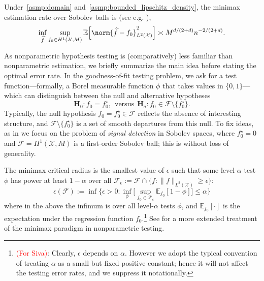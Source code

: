 \documentclass[twoside]{article}
\newcommand{\1}{\mathbf{1}}
\newcommand{\Xset}{\mathcal{X}}
\newcommand{\Leb}{L}
\newcommand{\mc}[1]{\mathcal{#1}}
\newcommand{\Ebb}{\mathbb{E}}
\newcommand{\wh}[1]{\widehat{#1}}
\theoremstyle{definition}
\theoremstyle{remark}
\begin{document}
Under~\ref{asmp:domain} and~\ref{asmp:bounded_lipschitz_density}, the minimax estimation rate over Sobolev balls is (see e.g. \citep{tsybakov2008_book}),
\begin{equation}
\label{eqn:sobolev_space_estimation_minimax_rate}
\inf_{\wh{f}} \sup_{f_0 \in H^1(\Xset, M)} \Ebb\Bigl[\norm{\wh{f} - f_0}_{L^2(\Xset)}^2\Bigr] \asymp M^{d/(2 + d)}n^{-2/(2 + d)}.
\end{equation}

As nonparametric hypothesis testing is (comparatively) less familiar than nonparametric estimation, we briefly summarize the main idea before stating the optimal error rate. In the goodness-of-fit testing problem, we ask for a test function---formally, a Borel measurable function $\phi$ that takes values in $\{0,1\}$--- which can distinguish between the null and alternative hypotheses
\begin{equation}
\mathbf{H}_0: f_0 = f_0^{\star}, ~~\textrm{versus}~~ \mathbf{H}_a: f_0 \in \mc{F} \setminus \{f_0^{\star}\}.
\end{equation} 
Typically, the null hypothesis $f_0 = f_0^{\star} \in \mc{F}$ reflects the absence of interesting structure, and $\mc{F} \setminus  \{f_0^{\star}\}$ is a set of smooth departures from this null. To fix ideas, as in \cite{ingster2009} we focus on the problem of \emph{signal detection} in Sobolev spaces, where $f_0^{\star} = 0$ and $\mc{F} = H^1(\Xset,M)$ is a first-order Sobolev ball; this is without loss of generality.

The minimax critical radius is the smallest value of $\epsilon$ such that some level-${\alpha}$ test $\phi$ has power at least $1 - \alpha$ over all $\mc{F}_{\epsilon} := \mc{F} \cap \{f: \|f\|_{\Leb^2(\Xset)} \geq \epsilon\}$:
\begin{equation*}
\epsilon(\mc{F}) := \inf\Biggl\{\epsilon > 0: \inf_{\phi} \biggl[ \sup_{f_0 \in \mc{F}_{\epsilon}} \Ebb_{f_0}[1 - \phi]\biggr] \leq \alpha\Biggr\}
\end{equation*} 
where in the above the infimum is over all level-$\alpha$ tests $\phi$, and $\Ebb_{f_0}[\cdot]$ is the expectation under the regression function $f_0$.\footnote{\textcolor{red}{(For Siva)}: Clearly, $\epsilon$ depends on $\alpha$. However we adopt the typical convention of treating $\alpha$ as a small but fixed positive constant; hence it will not affect the testing error rates, and we suppress it notationally.} See \citep{ingster82, ingster87, ingster2012, ariascastro2018} for a more extended treatment of the minimax paradigm in nonparametric testing. 
\end{document}
